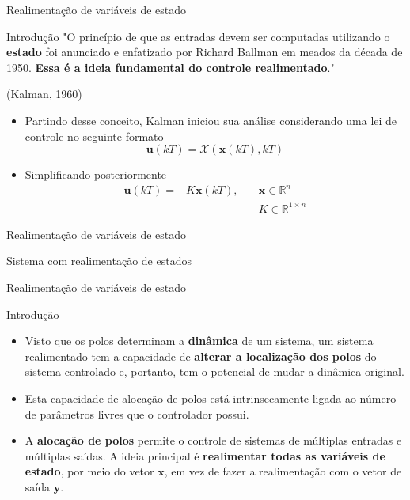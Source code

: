\begin{frame}{Realimentação de variáveis de estado}
\begin{block}{Introdução}
	"O princípio de que as entradas devem ser computadas utilizando o \textbf{estado} foi anunciado e enfatizado por Richard Ballman em meados da década de 1950. \textbf{Essa é a ideia fundamental do controle realimentado}."
	\begin{flushright}
		(Kalman, 1960)
	\end{flushright}
	\begin{itemize}
		\item Partindo desse conceito, Kalman iniciou sua análise considerando uma lei de controle no seguinte formato
		$$ \bm{u}(kT) = \mathcal{X}\left ( \bm{x}(kT), kT\right ) $$
		\item Simplificando posteriormente
		\begin{align*}
		\bm{u}(kT) = -K\bm{x}(kT), \quad  & \bm{x} \in \mathbb{R}^n \\ 
		& K \in \mathbb{R}^{1 \times n}
		\end{align*}
	\end{itemize}
\end{block}
\end{frame}

\begin{frame}{Realimentação de variáveis de estado}
\vspace{0,1 cm}
\begin{center}
	Sistema com realimentação de estados\\
	\scalebox{.8}{}
\end{center}
\end{frame}

\begin{frame}{Realimentação de variáveis de estado}
\begin{block}{Introdução}
\begin{itemize}
    \item Visto que os polos determinam a \textbf{dinâmica} de um sistema, um sistema realimentado tem a capacidade de \textbf{alterar a localização dos polos} do sistema controlado e, portanto, tem o potencial de mudar  a dinâmica original.
    \item Esta capacidade de alocação de polos está intrinsecamente ligada ao número de parâmetros livres que o controlador possui.
    \item A \textbf{alocação de polos} permite o controle de sistemas de múltiplas entradas e múltiplas saídas. A ideia principal é \textbf{realimentar todas as variáveis de estado}, por meio do vetor $\bm{x}$, em vez de fazer a realimentação com o vetor de saída $\bm{y}$.
\end{itemize}
\end{block}
\end{frame}

